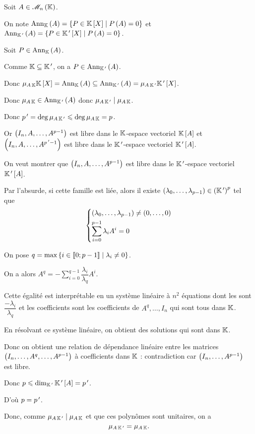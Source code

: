 \begin{dem}
Soit \(A\in\M{n}\).

On note \(\Ann[\K]{A}=\accol{P\in\poly\tq P\paren{A}=0}\) et \(\Ann[\K\prim]{A}=\accol{P\in\poly[\K\prim]\tq P\paren{A}=0}\).

Soit \(P\in\Ann[\K]{A}\).

Comme \(\mathbb{K}\subseteq\mathbb{K}^{\,\prime}\), on a \(P\in\Ann[\K\prim]{A}\).

Donc \(\mu_{A\,\K}\poly=\Ann[\K]{A}\subset\Ann[\K\prim]{A}=\mu_{A\,\K\prim}\poly[\K\prim]\).

Donc \(\mu_{A\,\K}\in\Ann[\K\prim]{A}\) donc \(\mu_{A\,\mathbb{K}^{\,\prime}}\mid\mu_{A\,\mathbb{K}}\).

Donc \(p^{\,\prime}=\deg\mu_{A\,\mathbb{K}^{\,\prime}}\leqslant\deg\mu_{A\,\mathbb{K}}=p\).

Or \(\left(I_n,A,\dots,A^{p-1}\right)\) est libre dans le \(\mathbb{K}\)-espace vectoriel \(\poly[\K][A]\) et \(\left(I_n,A,\dots,A^{p^{\,\prime}-1}\right)\) est libre dans le \(\mathbb{K}^{\,\prime}\)-espace vectoriel \(\poly[\K\prim][A]\).

On veut montrer que \(\left(I_n,A,\dots,A^{p-1}\right)\) est libre dans le \(\mathbb{K}^{\,\prime}\)-espace vectoriel \(\poly[\K\prim][A]\).

Par l'absurde, si cette famille est liée, alors il existe \(\left(\lambda_0,\dots,\lambda_{p-1}\right)\in\left(\mathbb{K}^{\,\prime}\right)^p\) tel que \[\begin{dcases}
\left(\lambda_0,\dots,\lambda_{p-1}\right)\not=\left(0,\dots,0\right) \\
\sum_{i=0}^{p-1}\lambda_iA^i=0
\end{dcases}\]

On pose \(q=\max\left\lbrace i\in\left\llbracket0;p-1\right\rrbracket\;\middle|\;\lambda_i\not=0\right\rbrace\).

On a alors \(A^q=-\sum_{i=0}^{q-1}\dfrac{\lambda_i}{\lambda_q}A^i\).

Cette égalité est interprétable en un système linéaire à \(n^2\) équations dont les  sont \(\dfrac{-\lambda_i}{\lambda_q}\) et les coefficients sont les coefficients de \(A^q,\dots,I_n\) qui sont tous dans \(\mathbb{K}\).

En résolvant ce système linéaire, on obtient des solutions qui sont dans \(\mathbb{K}\).

Donc on obtient une relation de dépendance linéaire entre les matrices \(\left(I_n,\dots,A^q,\dots,A^{p-1}\right)\) à coefficients dans \(\mathbb{K}\) : contradiction car \(\left(I_n,\dots,A^{p-1}\right)\) est libre.

Donc \(p\leq\dim_{\K\prim}\poly[\K\prim][A]=p\prim\).

D'où \(p=p^{\,\prime}\).

Donc, comme \(\mu_{A\,\mathbb{K}^{\,\prime}}\mid\mu_{A\,\mathbb{K}}\) et que ces polynômes sont unitaires, on a \[\mu_{A\,\mathbb{K}^{\,\prime}}=\mu_{A\,\mathbb{K}}.\]
\end{dem}

